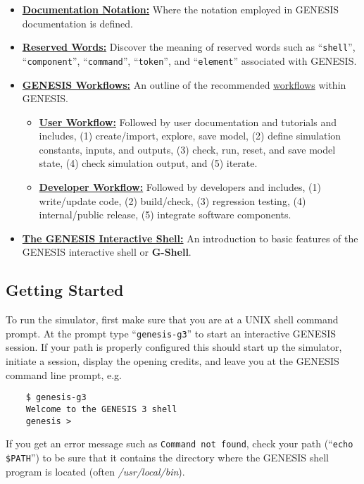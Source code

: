 \documentclass[12pt]{article}
\begin{document}
\begin{itemize}

\item \href{../document-notation/document-notation.tex}{\bf Documentation Notation:} Where the notation employed in GENESIS documentation is defined.

\item \href{../reserved-words/reserved-words.tex}{\bf Reserved Words:} Discover the meaning of reserved words such as ``{\tt shell}'', ``{\tt component}'', ``{\tt command}'', ``{\tt token}'', and ``{\tt element}'' associated with GENESIS.

\item \href{../workflow-intro/workflow-intro.tex}{\bf GENESIS Workflows:} An outline of the recommended \href{http://en.wikipedia.org/wiki/Workflow}{workflows} within GENESIS.
\begin{itemize}
\item \href{../workflow-user/workflow-user.tex}{\bf User Workflow:} Followed by user documentation and tutorials and includes, (1) create/import, explore, save model, (2) define simulation constants, inputs, and outputs, (3) check, run, reset, and save model state, (4) check simulation output, and (5) iterate.
\item \href{../workflow-developer/workflow-developer.tex}{\bf Developer Workflow:} Followed by developers and includes, (1) write/update code, (2) build/check, (3) regression testing, (4) internal/public release, (5) integrate software components.
\end{itemize}

\item \href{../gshell/gshell.tex}{\bf The GENESIS Interactive Shell:} An introduction to basic features of the GENESIS interactive shell or {\bf G-Shell}.

\end{itemize}

\subsection*{Getting Started}

To run the simulator, first make sure that you are at a UNIX shell command prompt. At the prompt type ``{\tt genesis-g3}'' to start an interactive GENESIS session. If your path is properly configured this should start up the simulator, initiate a session, display the opening credits, and leave you at the GENESIS command line prompt, e.g.
\begin{verbatim}
    $ genesis-g3
    Welcome to the GENESIS 3 shell
    genesis >
\end{verbatim}
If you get an error message such as {\tt Command not found}, check your path (``{\tt echo \$PATH}'') to be sure that it contains the directory where the GENESIS shell program is located (often {\it /usr/local/bin}).
\end{document}
